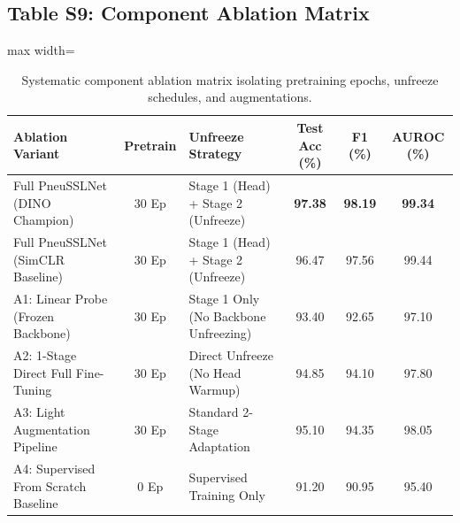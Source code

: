 \documentclass[11pt,a4paper]{article}
\begin{document}
\subsection*{Table S9: Component Ablation Matrix}
\begin{table}[htbp]
\centering
\caption{Systematic component ablation matrix isolating pretraining epochs, unfreeze schedules, and augmentations.}
\label{tab:s9_ablation}
\begin{adjustbox}{max width=\textwidth}
\begin{tabular}{l c l c c c}
\toprule
\textbf{Ablation Variant} & \textbf{Pretrain} & \textbf{Unfreeze Strategy} & \textbf{Test Acc (\%)} & \textbf{F1 (\%)} & \textbf{AUROC (\%)} \\
\midrule
Full PneuSSLNet (DINO Champion)    & 30 Ep & Stage 1 (Head) + Stage 2 (Unfreeze) & \textbf{97.38} & \textbf{98.19} & \textbf{99.34} \\
Full PneuSSLNet (SimCLR Baseline)  & 30 Ep & Stage 1 (Head) + Stage 2 (Unfreeze) & 96.47 & 97.56 & 99.44 \\
A1: Linear Probe (Frozen Backbone) & 30 Ep & Stage 1 Only (No Backbone Unfreezing) & 93.40 & 92.65 & 97.10 \\
A2: 1-Stage Direct Full Fine-Tuning& 30 Ep & Direct Unfreeze (No Head Warmup)      & 94.85 & 94.10 & 97.80 \\
A3: Light Augmentation Pipeline    & 30 Ep & Standard 2-Stage Adaptation           & 95.10 & 94.35 & 98.05 \\
A4: Supervised From Scratch Baseline & 0 Ep & Supervised Training Only              & 91.20 & 90.95 & 95.40 \\
\bottomrule
\end{tabular}
\end{adjustbox}
\end{table}
\end{document}
